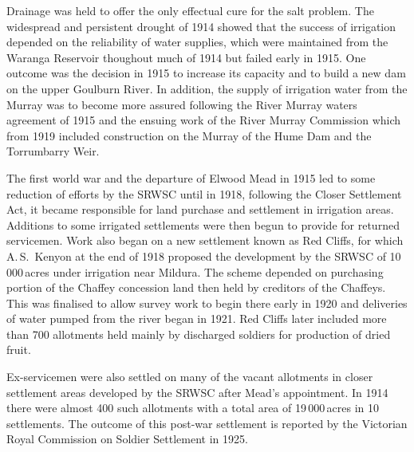 Drainage  was held to offer the only effectual cure
for the salt problem.  The widespread and persistent drought of 1914
showed that the success of irrigation depended on the reliability of
water supplies, wh\-ich were maintained from the Waranga Reservoir
thoughout much of 1914 but failed early in 1915.  One outcome was the
decision in 1915 to increase its capacity and to build a new dam on
the upper Goulburn River.  In addition, the
supply of irrigation water from the Murray was to become more assured
following the River Murray waters agreement of 1915 and the ensuing
work of the River Murray Commission which from 1919 included
construction on the Murray of the Hume Dam 
 and the
Torrumbarry Weir.

The first world war and the departure of Elwood Mead 
in 1915 led to some reduction of efforts by the SRWSC until in 1918,
following the Closer Settlement Act, it became responsible for land
purchase and settlement in irrigation areas.  Additions to some
irrigated settlements were then begun to provide for returned
servicemen.  Work also began on a new settlement known as Red Cliffs,
 for which A.\,S.~Kenyon 
 at the end of 1918 proposed the development by the SRWSC of
10\,000\,acres under irrigation near Mildura.  The scheme depended on
purchasing portion of the Chaffey concession land then held by
creditors of the Chaffeys.  This was finalised to allow survey work to
begin there early in 1920 and deliveries of water pumped from the
river began in 1921.  Red Cliffs later included more than 700
allotments held mainly by discharged soldiers for production of dried
fruit.

Ex-servicemen were also settled on many of the vacant allotments in
closer settlement areas developed by the SRWSC after Mead's
appointment.  In 1914 there were almost 400 such allotments with a
total area of 19\,000\,acres in 10 settlements. The outcome of this
post-war settlement is reported by the Victorian Royal Commission on
Soldier Settlement in 1925.

